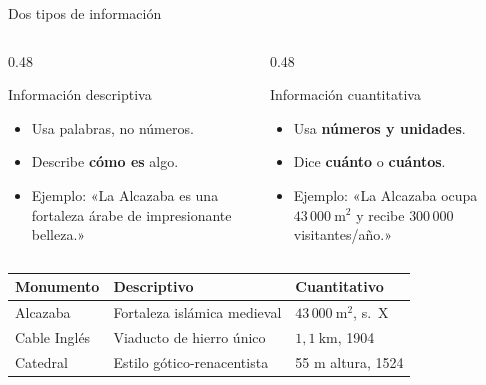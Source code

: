 \documentclass[aspectratio=169, 10pt, spanish]{beamer}
\begin{document}
\begin{frame}{Dos tipos de información}
  \begin{columns}[T]
    \begin{column}{0.48\textwidth}
      \begin{definicionbox}{Información descriptiva}
        \begin{itemize}
          \item Usa palabras, no números.
          \item Describe \textbf{cómo es} algo.
          \item Ejemplo: «La Alcazaba es una fortaleza árabe
                de impresionante belleza.»
        \end{itemize}
      \end{definicionbox}
    \end{column}
    \begin{column}{0.48\textwidth}
      \begin{definicionbox}{Información cuantitativa}
        \begin{itemize}
          \item Usa \textbf{números y unidades}.
          \item Dice \textbf{cuánto} o \textbf{cuántos}.
          \item Ejemplo: «La Alcazaba ocupa
                $43\,000\ \text{m}^2$ y
                recibe $300\,000$ visitantes/año.»
        \end{itemize}
      \end{definicionbox}
    \end{column}
  \end{columns}
  
  \begin{center}
    \begin{tabular}{lll}
      \toprule
      \textbf{Monumento} & \textbf{Descriptivo} & \textbf{Cuantitativo}\\
      \midrule
      Alcazaba   & Fortaleza islámica medieval & $43\,000\ \text{m}^2$, s.\ X\\
      Cable Inglés & Viaducto de hierro único   & $1{,}1\ \text{km}$, 1904\\
      Catedral   & Estilo gótico-renacentista   & 55 m altura, 1524\\
      \bottomrule
    \end{tabular}
  \end{center}
\end{frame}

\end{document}
